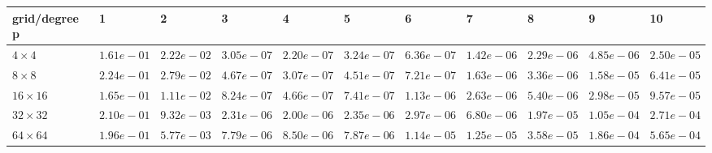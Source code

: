 \begin{tabular}{lllllllllll}
\hline
 grid/degree p   & 1          & 2          & 3          & 4          & 5          & 6          & 7          & 8          & 9          & 10         \\
\hline
 $4 \times 4$    & $1.61e-01$ & $2.22e-02$ & $3.05e-07$ & $2.20e-07$ & $3.24e-07$ & $6.36e-07$ & $1.42e-06$ & $2.29e-06$ & $4.85e-06$ & $2.50e-05$ \\
 $8 \times 8$    & $2.24e-01$ & $2.79e-02$ & $4.67e-07$ & $3.07e-07$ & $4.51e-07$ & $7.21e-07$ & $1.63e-06$ & $3.36e-06$ & $1.58e-05$ & $6.41e-05$ \\
 $16 \times 16$  & $1.65e-01$ & $1.11e-02$ & $8.24e-07$ & $4.66e-07$ & $7.41e-07$ & $1.13e-06$ & $2.63e-06$ & $5.40e-06$ & $2.98e-05$ & $9.57e-05$ \\
 $32 \times 32$  & $2.10e-01$ & $9.32e-03$ & $2.31e-06$ & $2.00e-06$ & $2.35e-06$ & $2.97e-06$ & $6.80e-06$ & $1.97e-05$ & $1.05e-04$ & $2.71e-04$ \\
 $64 \times 64$  & $1.96e-01$ & $5.77e-03$ & $7.79e-06$ & $8.50e-06$ & $7.87e-06$ & $1.14e-05$ & $1.25e-05$ & $3.58e-05$ & $1.86e-04$ & $5.65e-04$ \\
\hline
\end{tabular}